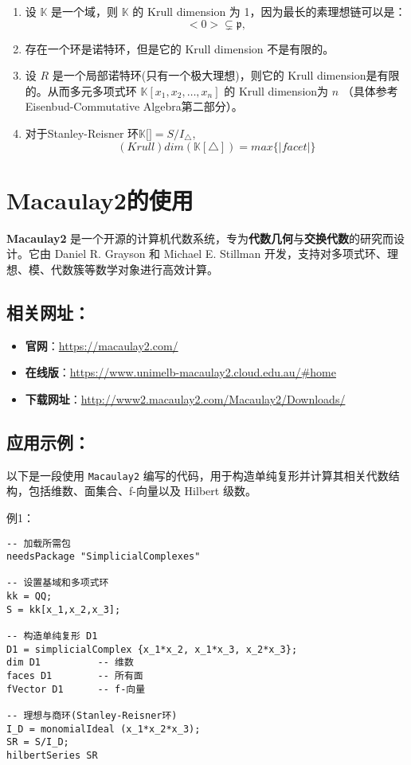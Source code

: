 \documentclass[12pt,a4paper]{ctexbook} %
\numberwithin{figure}{section}
\theoremstyle{problemstyle}
\numberwithin{equation}{section} %
\begin{document}
\begin{enumerate}
    \item 设 $ \mathbb{K} $ 是一个域，则 $ \mathbb{K}$ 的 Krull dimension 为 1，因为最长的素理想链可以是： $$ <0>  \subsetneq \mathfrak{p}, $$
    \item 存在一个环是诺特环，但是它的 Krull dimension 不是有限的。
    \item 设 $ R $ 是一个局部诺特环(只有一个极大理想)，则它的 Krull dimension是有限的。从而多元多项式环 $ \mathbb{K}[x_1, x_2, \ldots, x_n] $ 的 Krull dimension为 $ n $  （具体参考 Eisenbud-Commutative Algebra第二部分）。
    \item 对于Stanley-Reisner 环$\mathbb{K}[$\triangle$]=S/I_{\triangle}$, 
    $$(Krull)  dim(\mathbb{K}[\triangle]) = max\{|facet|\}$$
\end{enumerate}


\section{Macaulay2的使用}

\textbf{Macaulay2} 是一个开源的计算机代数系统，专为\textbf{代数几何}与\textbf{交换代数}的研究而设计。它由 Daniel R. Grayson 和 Michael E. Stillman 开发，支持对多项式环、理想、模、代数簇等数学对象进行高效计算。

\subsection{ 相关网址：}

\begin{itemize}
    \item \textbf{官网}：\url{https://macaulay2.com/}
    \item \textbf{在线版}：\url{https://www.unimelb-macaulay2.cloud.edu.au/#home}
    \item \textbf{下载网址}：\url{http://www2.macaulay2.com/Macaulay2/Downloads/}
\end{itemize}



\subsection{应用示例：}



以下是一段使用 \texttt{Macaulay2} 编写的代码，用于构造单纯复形并计算其相关代数结构，包括维数、面集合、f-向量以及 Hilbert 级数。

例1：
\begin{lstlisting}
-- 加载所需包
needsPackage "SimplicialComplexes"

-- 设置基域和多项式环
kk = QQ;
S = kk[x_1,x_2,x_3];

-- 构造单纯复形 D1
D1 = simplicialComplex {x_1*x_2, x_1*x_3, x_2*x_3};
dim D1          -- 维数
faces D1        -- 所有面
fVector D1      -- f-向量

-- 理想与商环(Stanley-Reisner环)
I_D = monomialIdeal (x_1*x_2*x_3);
SR = S/I_D;
hilbertSeries SR

\end{lstlisting}
\end{document}
